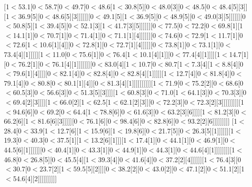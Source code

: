 [1$<$53.1[0$<$58.7[0$<$49.7[0$<$48.6[1$<$30.8[5][0$<$48.0[3][0$<$48.5[0$<$48.4[5][3]][1$<$36.9[5][0$<$48.6[5][3]]]]]][0$<$49.1[5][1$<$36.9[5][0$<$48.9[5][0$<$49.0[3][5]]]]]][0$<$50.8[5][1$<$39.4[5][0$<$52.1[3][1$<$41.7[3][5]]]]]][0$<$77.5[0$<$72.2[0$<$69.8[1][1$<$14.1[1][0$<$70.7[1][0$<$71.4[1][0$<$71.1[1][4]]]]]][0$<$74.6[0$<$72.9[1$<$11.7[1][0$<$72.6[1$<$10.6[1][4]][0$<$72.8[1][0$<$72.7[1][4]]]]][0$<$73.8[1][0$<$73.1[1][0$<$73.4[4][1]]]]][1$<$11.0[0$<$75.6[1][0$<$76.4[1$<$10.1[4][1]][0$<$77.4[4][1]]]][1$<$14.7[1][0$<$76.2[1][0$<$76.1[4][1]]]]]]][0$<$83.0[4][1$<$10.7[0$<$80.7[1$<$7.3[4][1$<$8.8[4][0$<$79.6[1][4]]]][0$<$82.1[4][0$<$82.8[4][0$<$82.8[4][1]]]]][1$<$12.7[4][0$<$81.8[4][0$<$79.1[4][0$<$80.8[0$<$80.1[1][4]][0$<$81.3[4][1]]]]]]]]]][1$<$71.9[0$<$75.2[2][0$<$68.6[0$<$60.5[3][0$<$56.6[3][0$<$51.3[5][3]]]][1$<$60.8[3][0$<$71.0[1$<$64.1[3][0$<$70.3[3][0$<$69.4[2][3]]]][1$<$66.0[2][1$<$62.5[1$<$62.1[2][3]][0$<$72.2[3][0$<$72.3[2][3]]]]]]]]][1$<$94.6[6][0$<$69.2[0$<$64.4[1$<$78.8[6][0$<$61.6[3][0$<$63.2[3][6]]]][1$<$81.2[3][0$<$66.2[6][1$<$81.6[6][3]]]]][0$<$76.1[6][0$<$98.4[6][0$<$82.8[6][0$<$93.2[2][6]]]]]]]]]
[1$<$28.4[0$<$33.9[1$<$12.7[6][1$<$15.9[6][1$<$19.8[6][0$<$21.7[5][0$<$26.3[5][1]]]]]][1$<$19.3[0$<$40.3[0$<$37.5[1][1$<$13.2[6][1]]][1$<$17.4[1][0$<$44.1[1][0$<$46.9[1][0$<$44.5[6][1]]]]]][0$<$40.4[1][0$<$43.3[1][0$<$44.9[1][0$<$44.3[1][0$<$44.6[4][1]]]]]]]][1$<$46.8[0$<$26.8[5][0$<$45.5[4][1$<$39.3[4][0$<$41.6[4][0$<$37.2[2][4]]]]]][1$<$76.4[3][0$<$30.7[0$<$23.7[2][1$<$59.5[5][2]]][0$<$38.2[2][0$<$43.0[2][0$<$47.1[2][0$<$51.1[2][1$<$54.6[4][2]]]]]]]]]]
